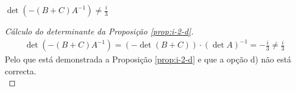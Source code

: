 \begin{proposition}\label{prop:i-2-d}
	$\det(-(B + C)A^{-1}) \neq \frac{i}{3}$
\end{proposition}

\vspace{0.25cm}

\begin{proof}[Cálculo do determinante da Proposição \ref{prop:i-2-d}]
	\begin{align*}
		\det(-(B + C)A^{-1})
			   = (-\det(B + C))  \cdot (\det A)^{-1}
			   = -\frac{i}{3} \neq \frac{i}{3}
	\end{align*}
	Pelo que está demonstrada a Proposição \ref{prop:i-2-d} e que a opção d)
	não está correcta.\\
\end{proof}



